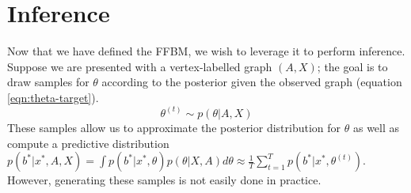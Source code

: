 \section{Inference}

Now that we have defined the FFBM, we wish to leverage it to perform inference. Suppose we are presented with a vertex-labelled graph $(A, X)$; the goal is to draw samples for $\theta$ according to the posterior given the observed graph (equation \ref{eqn:theta-target}). 
%
\begin{equation}
	\label{eqn:theta-target}
	\theta^{(t)} \sim p(\theta | A, X)
\end{equation}
%
These samples allow us to approximate the posterior distribution for $\theta$ as well as compute a predictive distribution $p(b^* | x^*, A, X) = \int p(b^* | x^*, \theta) p(\theta | X, A) d\theta \approx \frac{1}{T} \sum_{t=1}^{T} p(b^* | x^*, \theta^{(t)})$. However, generating these samples is not easily done in practice.

